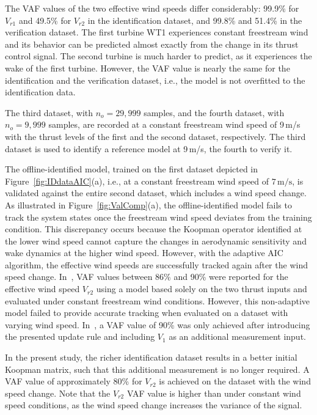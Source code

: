 The VAF values of the two effective wind speeds differ considerably: 99.9\% for $V_{r1}$ and 49.5\% for $V_{r2}$ in the identification dataset, and 99.8\% and 51.4\% in the verification dataset. The first turbine WT1 experiences constant freestream wind and its behavior can be predicted almost exactly from the change in its thrust control signal. The second turbine is much harder to predict, as it experiences the wake of the first turbine. However, the VAF value is nearly the same for the identification and the verification dataset, i.e., the model is not overfitted to the identification data.

The third dataset, with $n_o = 29,999$ samples, and the fourth dataset, with $n_o = 9,999$ samples, are recorded at a constant freestream wind speed of 9\,m/s with the thrust levels of the first and the second dataset, respectively. The third dataset is used to identify a reference model at 9\,m/s, the fourth to verify it.


The offline-identified model, trained on the first dataset depicted in Figure~\ref{fig:IDdataAIC}(a), i.e., at a constant freestream wind speed of $7\,\mathrm{m/s}$, is validated against the entire second dataset, which includes a wind speed change. As illustrated in Figure~\ref{fig:ValComp}(a), the offline-identified model fails to track the system states once the freestream wind speed deviates from the training condition. This discrepancy occurs because the Koopman operator identified at the lower wind speed cannot capture the changes in aerodynamic sensitivity and wake dynamics at the higher wind speed. However, with the adaptive AIC algorithm, the effective wind speeds are successfully tracked again after the wind speed change. In~\cite{sharan2022Koopman}, VAF values between 86\% and 90\% were reported for the effective wind speed $V_{r2}$ using a model based solely on the two thrust inputs and evaluated under constant freestream wind conditions. However, this non-adaptive model failed to provide accurate tracking when evaluated on a dataset with varying wind speed. In~\cite{dittmer2022data}, a VAF value of 90\% was only achieved after introducing the presented update rule and including $V_1$ as an additional measurement input.

In the present study, the richer identification dataset results in a better initial Koopman matrix, such that this additional measurement is no longer required. A VAF value of approximately 80\% for $V_{r2}$ is achieved on the dataset with the wind speed change. Note that the $V_{r2}$ VAF value is higher than under constant wind speed conditions, as the wind speed change increases the variance of the signal.


